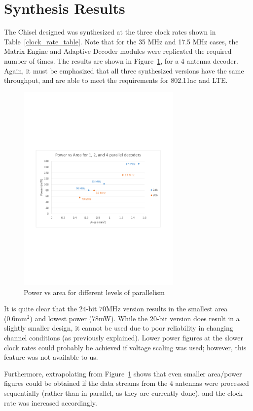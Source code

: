 \documentclass[journal]{IEEEtran}
\begin{document}
\section{Synthesis Results}

The Chisel designed was synthesized at the three clock rates shown in Table~\ref{clock_rate_table}. Note that for the 35 MHz and 17.5 MHz cases, the Matrix Engine and Adaptive Decoder modules were replicated the required number of times. The results are shown in Figure~\ref{power_vs_area}, for a 4 antenna decoder. Again, it must be emphasized that all three synthesized versions have the same throughput, and are able to meet the requirements for 802.11ac and LTE.

\begin{figure}[!h]
\centering
\includegraphics*[width=8cm, viewport = 60 250 560 540]{images/power_vs_area.pdf}
\caption{Power vs area for different levels of parallelism}
\label{power_vs_area}
\end{figure}

It is quite clear that the 24-bit 70MHz version results in the smallest area (0.6mm$^2$) and lowest power (78mW). While the 20-bit version does result in a slightly smaller design, it cannot be used due to poor reliability in changing channel conditions (as previously explained). Lower power figures at the slower clock rates could probably be achieved if voltage scaling was used; however, this feature was not available to us.

Furthermore, extrapolating from Figure~\ref{power_vs_area} shows that even smaller area/power figures could be obtained if the data streams from the 4 antennas were processed sequentially (rather than in parallel, as they are currently done), and the clock rate was increased accordingly.
\end{document}
